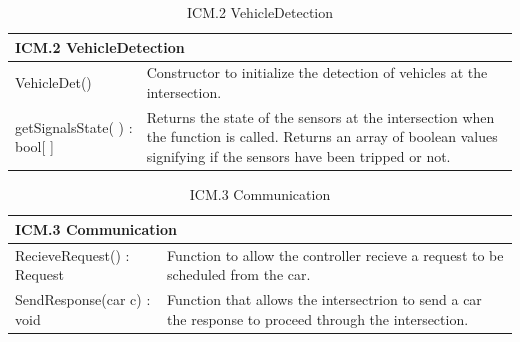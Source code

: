 \documentclass [10pt]{article}
\begin{document}
\begin{longtable}{| p{ } | p{ } | }\caption{ICM.2 VehicleDetection} \\\hline  
 \multicolumn{2}{|l|}{\textbf {ICM.2 VehicleDetection}}\\ \hline
 
\cellcolor{tableCell}VehicleDet()& \cellcolor{tableCell}Constructor to initialize the detection of vehicles at the intersection. \\ \hline 

getSignalsState( ) : bool[ ] & Returns the state of the sensors at the intersection when the function is called. Returns an array of boolean values signifying if the sensors have been tripped or not. \\ \hline 



\end{longtable}

\begin{longtable}{| p{ } | p{ } | }\caption{ICM.3 Communication} \\\hline  
 \multicolumn{2}{|l|}{\textbf {ICM.3 Communication}}\\ \hline
 
\cellcolor{tableCell}RecieveRequest() : Request& \cellcolor{tableCell}Function to allow the controller recieve a request to be scheduled from the car.\\ \hline 


\cellcolor{tableCell}SendResponse(car c) : void & \cellcolor{tableCell}Function that allows the intersectrion to send a car the response to proceed through the intersection. \\ \hline




\end{longtable}
\end{document}
